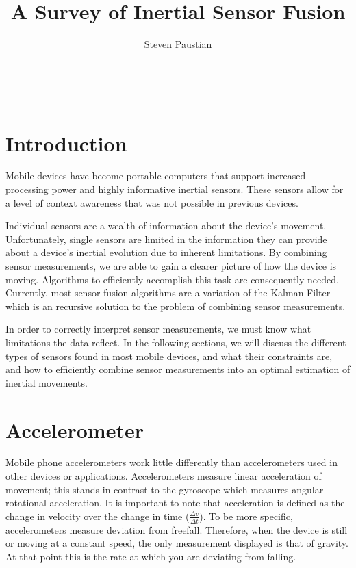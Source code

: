 \documentclass{acm_proc_article-sp}
\begin{document}
\title{A Survey of Inertial Sensor Fusion}


\author{
\alignauthor Steven Paustian\\
       \\
       \\
       \\
}

\maketitle

\section{Introduction}

Mobile devices have become portable computers that support increased processing power and highly informative inertial sensors.  These sensors allow
for a level of context awareness that was not possible in previous devices.

Individual sensors are a wealth of information about the device's movement.  Unfortunately, single sensors are limited in the information they can provide about a device's inertial evolution due to inherent limitations.  By combining sensor measurements, we are able to gain a clearer picture of how the device is moving.  Algorithms to efficiently accomplish this task are consequently needed.  Currently, most sensor fusion algorithms are a variation of the Kalman Filter which is an recursive solution to the problem of combining sensor measurements.

In order to correctly interpret sensor measurements, we must know what limitations the data reflect.  In the following sections, we will discuss the different types of sensors found in most mobile devices, and what their constraints are, and how to efficiently combine sensor measurements into an optimal estimation of inertial movements.

\section{Accelerometer}

Mobile phone accelerometers work little differently than accelerometers used in other
devices or applications.\cite{brezmes2009activity}  Accelerometers measure linear acceleration of movement; this
stands in contrast to the gyroscope which measures angular rotational acceleration.
It is important to note that acceleration is defined as the change in
velocity over the change in time ($\frac{\Delta v}{\Delta t}$). To be more
specific, accelerometers measure deviation from freefall.  Therefore,
when the device is still or moving at a constant speed, the only measurement
displayed is that of gravity.  At that point this is the rate at which you are deviating from
falling.\cite{accell}
\end{document}
